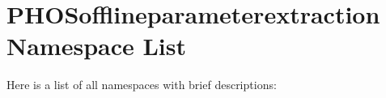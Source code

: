 \section{PHOSofflineparameterextraction Namespace List}
Here is a list of all namespaces with brief descriptions:\begin{CompactList}
\item{}
\item{}
\end{CompactList}
